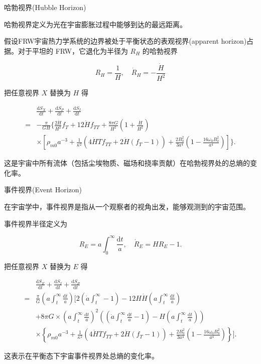 \documentclass[9pt, dvipsnames]{beamer} %
\begin{document}
\begin{frame}{哈勃视界(Hubble Horizon)}

    哈勃视界定义为光在宇宙膨胀过程中能够到达的最远距离。

    假设FRW宇宙热力学系统的边界被处于平衡状态的表观视界(apparent horizon)占据。对于平坦的 FRW，它退化为半径为 $R_H$ 的哈勃视界

    $$
    R_H = \frac{1 }{H } ,\quad
    \dot{R}_H = -\frac{\dot{H} }{H^2 }
    $$

    把任意视界 $X$ 替换为 $H$ 得

    $$
    \begin{aligned}
        &\frac{\mathrm{d}S_X }{\mathrm{d}t } + \frac{\mathrm{d}S_P }{\mathrm{d}t } + \frac{\mathrm{d}S_I }{\mathrm{d}t } \\
        =&-\frac{\pi }{G H} \bigg\{\frac{2\dot{H} }{H^2 } f_T + 12\dot{H}f_{TT} +\frac{8\pi G }{H^2 }\left(1+\frac{\dot{H} }{H^2 }  \right) \\
        &\times \left[\rho_{m0}a^{-3} + \frac{1 }{\kappa^2 } \left(4\dot{H}T f_{TT} + 2\dot{H}\left(f_T-1 \right) \right) + \frac{2 B_0^2 }{3a^4 } \left(1-\frac{16\omega_0 B_0^2 }{a^4 }  \right) \right] \bigg\}.
        \end{aligned}
    $$

    这是宇宙中所有流体（包括尘埃物质、磁场和挠率贡献）在哈勃视界处的总熵的变化率。
    
\end{frame}

\begin{frame}{事件视界(Event Horizon)}

    在宇宙学中，事件视界是指从一个观察者的视角出发，能够观测到的宇宙范围。

    事件视界半径定义为

    $$
    R_E = a\int_0^{\infty} \frac{\mathrm{d}t }{a } ,\quad
    \dot{R}_E = H R_E - 1.
    $$

    把任意视界 $X$ 替换为 $E$ 得

    $$
    \begin{aligned}
        &\frac{\mathrm{d}S_E}{\mathrm{d}t} + \frac{\mathrm{d}S_I}{\mathrm{d}t} + \frac{\mathrm{d}S_P}{\mathrm{d}t} \\
        =&\frac{\pi}{G} \left(a\int_t^\infty \frac{\mathrm{d}t}{a}\right)\bigg[2\left(\dot{a}\int_t^\infty -1 \right) - 12H\dot{H} \left(a\int_t^\infty \frac{\mathrm{d}t}{a}\right) \\
        &+8\pi G\times \left(a\int_t^\infty\frac{\mathrm{d}t}{a}\right)^2\left(\left(\dot{a}\int_t^\infty\frac{\mathrm{d}t}{a}-1\right)-H\left(a\int_t^\infty\frac{\mathrm{d}t}{a}\right)\right) \\
        &\times \left\{\rho_{m0}a^{-3} + \frac{1}{\kappa^2} \left(4\dot{H}T f_{TT} + 2\dot{H}(f_T-1)\right) + \frac{2B_0^2}{3a^4}\left(1-\frac{16\omega_0B_0^2}{a^4}\right) \right\} \bigg]. 
    \end{aligned}
    $$

    这表示在平衡态下宇宙事件视界处总熵的变化率。

\end{frame}
\end{document}
